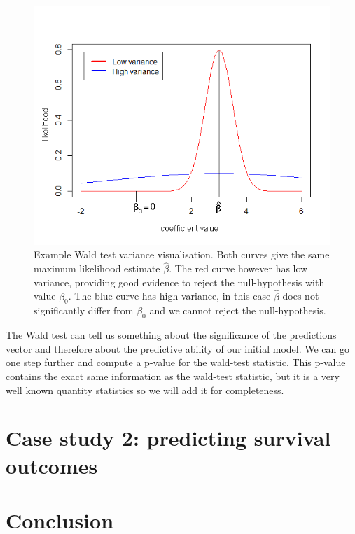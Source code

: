 \begin{figure}
	\centering
	\includegraphics[scale=.7]{images/wald_test}
	\caption{Example Wald test variance visualisation. Both curves give the same maximum likelihood estimate $\hat{\beta}$. The red curve however has low variance, providing good evidence to reject the null-hypothesis with value $\beta_{0}$. The blue curve has high variance, in this case $\hat{\beta}$ does not significantly differ from $\beta_{0}$ and we cannot reject the null-hypothesis.}
	\label{fig:evaluation-wald-test}
\end{figure}
The Wald test can tell us something about the significance of the predictions vector and therefore about the predictive ability of our initial model. We can go one step further and compute a p-value\cite{pvalue1}\cite{wikip} for the wald-test statistic. This p-value contains the exact same information as the wald-test statistic, but it is a very well known quantity statistics so we will add it for completeness.
\section{Case study 2: predicting survival outcomes}
\label{sec:evaluation-predictingsurvival}

\section{Conclusion}
\label{sec:evaluation-conclusion}
